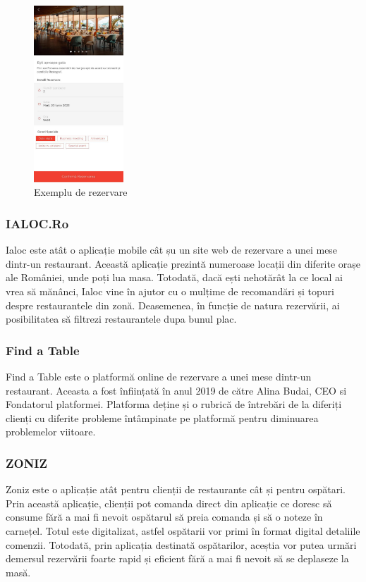 \documentclass[a4paper,12pt]{book}
\begin{document}
\begin{figure}[ht]
\centering
  \includegraphics[width=0.3\textwidth]{poza4.png}
  \caption{Exemplu de rezervare}
  \label{fig:rezervare}
\end{figure}

\subsubsection{IALOC.Ro}
Ialoc  este atât o aplicație mobile cât șu un site web de rezervare a unei mese dintr-un restaurant. Această aplicație prezintă numeroase locații din diferite orașe ale României, unde poți lua masa. Totodată, dacă ești nehotărât la ce local ai vrea să mănânci, Ialoc vine în ajutor cu o mulțime de recomandări și topuri despre restaurantele din zonă. Deasemenea, în funcție de natura rezervării, ai posibilitatea să filtrezi restaurantele dupa bunul plac.

\subsubsection{Find a Table}
Find a Table  este o platformă online de rezervare a unei mese dintr-un restaurant. Aceasta a fost înființată în anul 2019 de către Alina Budai, CEO si Fondatorul platformei. Platforma deține și o rubrică de întrebări de la diferiți clienți cu diferite probleme întâmpinate pe platformă pentru diminuarea problemelor viitoare. 

\subsubsection{ZONIZ}
Zoniz  este o aplicație atât pentru clienții de restaurante cât și pentru ospătari. Prin această aplicație, clienții pot comanda direct din aplicație ce doresc să consume fără a mai fi nevoit ospătarul să preia comanda și să o noteze în carnețel. Totul este digitalizat, astfel ospătarii vor primi în format digital detaliile comenzii. Totodată, prin aplicația destinată ospătarilor, aceștia vor putea urmări demersul rezervării foarte rapid și eficient fără a mai fi nevoit să se deplaseze la masă. 
\end{document}
